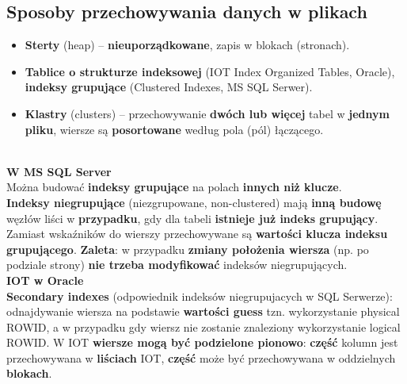 \documentclass[a4paper]{article}
\begin{document}
\subsection{Sposoby przechowywania danych w plikach}
\begin{itemize}
    \item \textbf{Sterty} (heap) – \textbf{nieuporządkowane}, zapis w blokach (stronach).
    \item \textbf{Tablice o strukturze indeksowej} (IOT Index Organized Tables, Oracle), \textbf{indeksy grupujące} (Clustered Indexes, MS SQL Serwer).
    \item \textbf{Klastry} (clusters) – przechowywanie \textbf{dwóch lub więcej} tabel w \textbf{jednym pliku}, wiersze są \textbf{posortowane} według pola (pól) łączącego.
\end{itemize}
\hfil \\
\textbf{W MS SQL Server}\\
Można budować \textbf{indeksy grupujące} na polach \textbf{innych niż klucze}.\\
\textbf{Indeksy niegrupujące} (niezgrupowane, non-clustered) mają \textbf{inną budowę} węzłów liści w \textbf{przypadku}, gdy dla tabeli \textbf{istnieje już indeks grupujący}. Zamiast wskaźników do wierszy przechowywane są \textbf{wartości klucza indeksu grupującego}. \textbf{Zaleta}: w przypadku \textbf{zmiany położenia wiersza} (np. po podziale strony)
\textbf{nie trzeba modyfikować} indeksów niegrupujących.\\

\textbf{IOT w Oracle}\\
\textbf{Secondary indexes} (odpowiednik indeksów niegrupujacych w SQL Serwerze): odnajdywanie wiersza na podstawie \textbf{wartości guess} tzn. wykorzystanie physical ROWID, a w przypadku gdy wiersz nie zostanie znaleziony wykorzystanie logical ROWID. W IOT \textbf{wiersze mogą być podzielone pionowo}: \textbf{część} kolumn jest przechowywana w \textbf{liściach} IOT, \textbf{część} może być przechowywana w oddzielnych \textbf{blokach}. 
\end{document}
